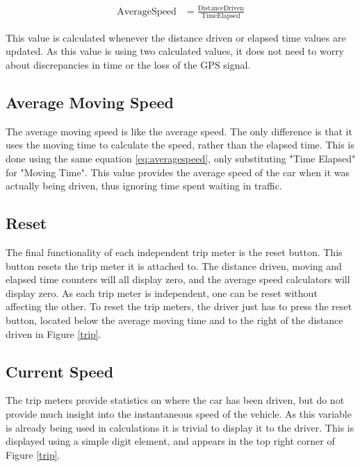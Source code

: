 \begin{align}
\label{eq:averagespeed}
\mathrm{Average Speed} &=\frac{\mathrm{Distance Driven}}{\mathrm{Time Elapsed}}
\end{align}

This value is calculated whenever the distance driven or elapsed time values are updated. As this value is using two calculated values, it does not need to worry about discrepancies in time or the loss of the GPS signal.

\subsection{Average Moving Speed}

The average moving speed is like the average speed. The only difference is that it uses the moving time to calculate the speed, rather than the elapsed time. This is done using the same equation \ref{eq:averagespeed}, only substituting "Time Elapsed" for "Moving Time". This value provides the average speed of the car when it was actually being driven, thus ignoring time spent waiting in traffic.

\subsection{Reset}

The final functionality of each independent trip meter is the reset button. This button resets the trip meter it is attached to. The distance driven, moving and elapsed time counters will all display zero, and the average speed calculators will display zero. As each trip meter is independent, one can be reset without affecting the other. To reset the trip meters, the driver just has to press the reset button, located below the average moving time and to the right of the distance driven in Figure \ref{trip}.

\subsection{Current Speed}

The trip meters provide statistics on where the car has been driven, but do not provide much insight into the instantaneous speed of the vehicle. As this variable is already being used in calculations it is trivial to display it to the driver. This is displayed using a simple digit element, and appears in the top right corner of Figure \ref{trip}.




